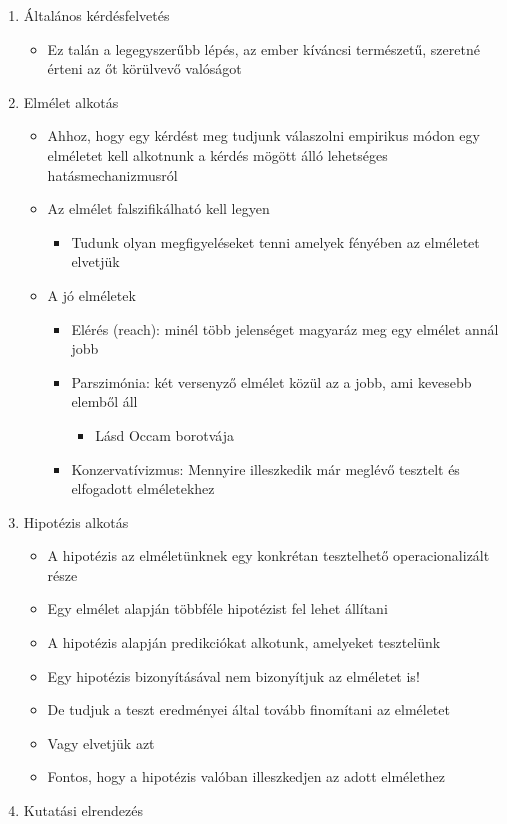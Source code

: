 \documentclass[
  letterpaper,
  DIV=11,
  numbers=noendperiod]{scrreprt}
\providecommand{\tightlist}{%
  \setlength{\itemsep}{0pt}\setlength{\parskip}{0pt}}\usepackage{longtable,booktabs,array}
\begin{document}
\begin{enumerate}
\def\labelenumi{\arabic{enumi}.}
\item
  Általános kérdésfelvetés

  \begin{itemize}
  \tightlist
  \item
    Ez talán a legegyszerűbb lépés, az ember kíváncsi természetű,
    szeretné érteni az őt körülvevő valóságot
  \end{itemize}
\item
  Elmélet alkotás

  \begin{itemize}
  \item
    Ahhoz, hogy egy kérdést meg tudjunk válaszolni empirikus módon egy
    elméletet kell alkotnunk a kérdés mögött álló lehetséges
    hatásmechanizmusról
  \item
    Az elmélet falszifikálható kell legyen

    \begin{itemize}
    \tightlist
    \item
      Tudunk olyan megfigyeléseket tenni amelyek fényében az elméletet
      elvetjük
    \end{itemize}
  \item
    A jó elméletek

    \begin{itemize}
    \item
      Elérés (reach): minél több jelenséget magyaráz meg egy elmélet
      annál jobb
    \item
      Parszimónia: két versenyző elmélet közül az a jobb, ami kevesebb
      elemből áll

      \begin{itemize}
      \tightlist
      \item
        Lásd Occam borotvája
      \end{itemize}
    \item
      Konzervatívizmus: Mennyire illeszkedik már meglévő tesztelt és
      elfogadott elméletekhez
    \end{itemize}
  \end{itemize}
\item
  Hipotézis alkotás

  \begin{itemize}
  \item
    A hipotézis az elméletünknek egy konkrétan tesztelhető
    operacionalizált része
  \item
    Egy elmélet alapján többféle hipotézist fel lehet állítani
  \item
    A hipotézis alapján predikciókat alkotunk, amelyeket tesztelünk
  \item
    Egy hipotézis bizonyításával nem bizonyítjuk az elméletet is!
  \item
    De tudjuk a teszt eredményei által tovább finomítani az elméletet
  \item
    Vagy elvetjük azt
  \item
    Fontos, hogy a hipotézis valóban illeszkedjen az adott elmélethez
  \end{itemize}
\item
  Kutatási elrendezés


\end{enumerate}
\end{document}
